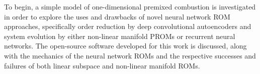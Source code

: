 
To begin, a simple model of one-dimensional premixed combustion is investigated in order to explore the uses and drawbacks of novel neural network ROM approaches, specifically order reduction by deep convolutional autoencoders and system evolution by either non-linear manifold PROMs or recurrent neural networks. The open-source software developed for this work is discussed, along with the mechanics of the neural network ROMs and the respective successes and failures of both linear subspace and non-linear manifold ROMs.